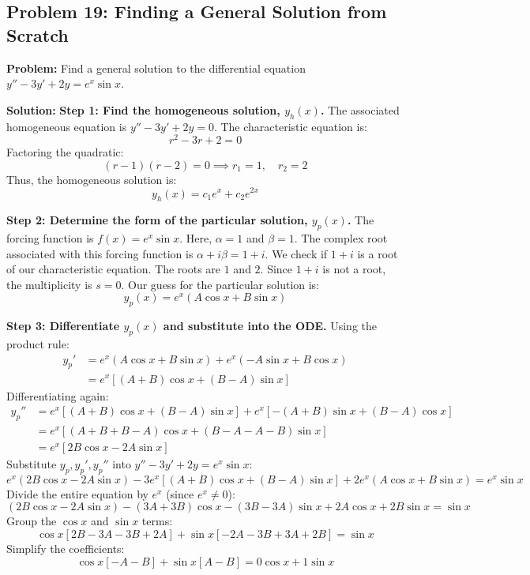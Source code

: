 \documentclass[12pt]{article}
\begin{document}
\subsection{Problem 19: Finding a General Solution from Scratch}
\textbf{Problem:} Find a general solution to the differential equation $y'' - 3y' + 2y = e^x \sin x$.

\textbf{Solution:}
\textbf{Step 1: Find the homogeneous solution, $y_h(x)$.}
The associated homogeneous equation is $y'' - 3y' + 2y = 0$.
The characteristic equation is:
\[ r^2 - 3r + 2 = 0 \]
Factoring the quadratic:
\[ (r - 1)(r - 2) = 0 \implies r_1 = 1, \quad r_2 = 2 \]
Thus, the homogeneous solution is:
\[ y_h(x) = c_1 e^x + c_2 e^{2x} \]

\textbf{Step 2: Determine the form of the particular solution, $y_p(x)$.}
The forcing function is $f(x) = e^x \sin x$. Here, $\alpha = 1$ and $\beta = 1$.
The complex root associated with this forcing function is $\alpha + i\beta = 1 + i$.
We check if $1 + i$ is a root of our characteristic equation. The roots are $1$ and $2$. Since $1 + i$ is not a root, the multiplicity is $s = 0$.
Our guess for the particular solution is:
\[ y_p(x) = e^x (A \cos x + B \sin x) \]

\textbf{Step 3: Differentiate $y_p(x)$ and substitute into the ODE.}
Using the product rule:
\begin{align*}
y_p' &= e^x (A \cos x + B \sin x) + e^x (-A \sin x + B \cos x) \\
     &= e^x \left[ (A + B) \cos x + (B - A) \sin x \right]
\end{align*}
Differentiating again:
\begin{align*}
y_p'' &= e^x \left[ (A + B) \cos x + (B - A) \sin x \right] + e^x \left[ -(A + B) \sin x + (B - A) \cos x \right] \\
      &= e^x \left[ (A + B + B - A) \cos x + (B - A - A - B) \sin x \right] \\
      &= e^x \left[ 2B \cos x - 2A \sin x \right]
\end{align*}
Substitute $y_p, y_p', y_p''$ into $y'' - 3y' + 2y = e^x \sin x$:
\[ e^x (2B \cos x - 2A \sin x) - 3e^x \left[ (A + B) \cos x + (B - A) \sin x \right] + 2e^x (A \cos x + B \sin x) = e^x \sin x \]
Divide the entire equation by $e^x$ (since $e^x \neq 0$):
\[ (2B \cos x - 2A \sin x) - (3A + 3B) \cos x - (3B - 3A) \sin x + 2A \cos x + 2B \sin x = \sin x \]
Group the $\cos x$ and $\sin x$ terms:
\[ \cos x \left[ 2B - 3A - 3B + 2A \right] + \sin x \left[ -2A - 3B + 3A + 2B \right] = \sin x \]
Simplify the coefficients:
\[ \cos x \left[ -A - B \right] + \sin x \left[ A - B \right] = 0 \cos x + 1 \sin x \]
\end{document}
